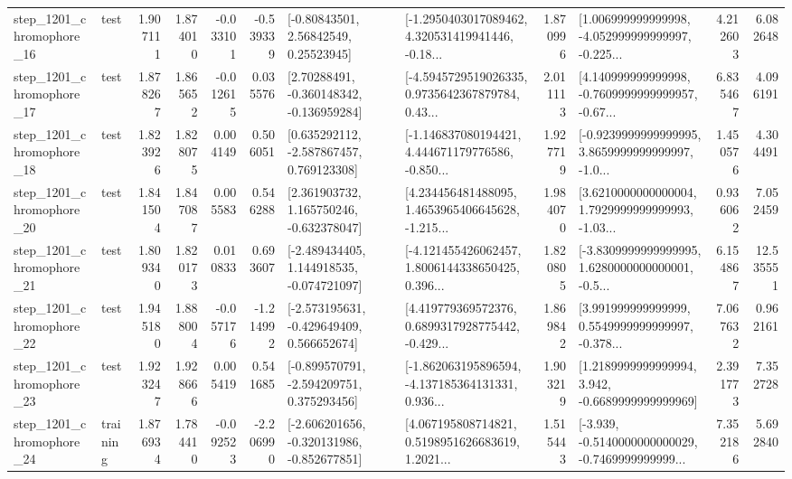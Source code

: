 \begin{tabular}{llrrrrllrlrr}
 step\_1201\_chromophore\_16 &      test &      1.907111 &    1.874010 &     -0.033101 & -0.539339 &       [-0.80843501, 2.56842549, 0.25523945] &  [-1.2950403017089462, 4.320531419941446, -0.18... &       1.870996 &  [1.006999999999998, -4.052999999999997, -0.225... &            4.212603 &          6.082648 \\
 step\_1201\_chromophore\_17 &      test &      1.878267 &    1.865652 &     -0.012615 &  0.035576 &    [2.70288491, -0.360148342, -0.136959284] &  [-4.5945729519026335, 0.9735642367879784, 0.43... &       2.011113 &  [4.140999999999998, -0.7609999999999957, -0.67... &            6.835467 &          4.096191 \\
 step\_1201\_chromophore\_18 &      test &      1.823926 &    1.828075 &      0.004149 &  0.506051 &    [0.635292112, -2.587867457, 0.769123308] &  [-1.146837080194421, 4.444671179776586, -0.850... &       1.927719 &  [-0.9239999999999995, 3.8659999999999997, -1.0... &            1.450576 &          4.304491 \\
 step\_1201\_chromophore\_20 &      test &      1.841504 &    1.847087 &      0.005583 &  0.546288 &    [2.361903732, 1.165750246, -0.632378047] &  [4.234456481488095, 1.4653965406645628, -1.215... &       1.984070 &  [3.6210000000000004, 1.7929999999999993, -1.03... &            0.936062 &          7.052459 \\
 step\_1201\_chromophore\_21 &      test &      1.809340 &    1.820173 &      0.010833 &  0.693607 &   [-2.489434405, 1.144918535, -0.074721097] &  [-4.121455426062457, 1.8006144338650425, 0.396... &       1.820805 &  [-3.8309999999999995, 1.6280000000000001, -0.5... &            6.154867 &         12.535551 \\
 step\_1201\_chromophore\_22 &      test &      1.945180 &    1.888004 &     -0.057176 & -1.214992 &   [-2.573195631, -0.429649409, 0.566652674] &  [4.419779369572376, 0.6899317928775442, -0.429... &       1.869842 &  [3.991999999999999, 0.5549999999999997, -0.378... &            7.067632 &          0.962161 \\
 step\_1201\_chromophore\_23 &      test &      1.923247 &    1.928666 &      0.005419 &  0.541685 &   [-0.899570791, -2.594209751, 0.375293456] &  [-1.862063195896594, -4.137185364131331, 0.936... &       1.903219 &   [1.2189999999999994, 3.942, -0.6689999999999969] &            2.391773 &          7.352728 \\
 step\_1201\_chromophore\_24 &  training &      1.876934 &    1.784410 &     -0.092523 & -2.206990 &  [-2.606201656, -0.320131986, -0.852677851] &  [4.067195808714821, 0.5198951626683619, 1.2021... &       1.515443 &  [-3.939, -0.5140000000000029, -0.7469999999999... &            7.352186 &          5.692840 \\

\end{tabular}

